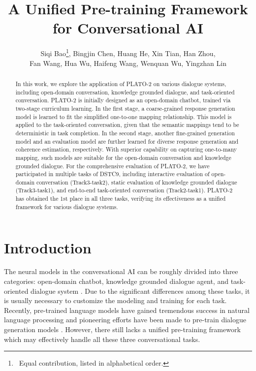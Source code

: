 \documentclass[letterpaper]{article} \usepackage{aaai21}  \usepackage{times}  \usepackage{helvet} \usepackage{courier}  \usepackage[hyphens]{url}  \usepackage{graphicx} \urlstyle{rm} \def\UrlFont{\rm}  \usepackage{natbib}  \usepackage{caption} \frenchspacing  \setlength{\pdfpagewidth}{8.5in}  \setlength{\pdfpageheight}{11in}  \usepackage{amsmath}
\title{A Unified Pre-training Framework for Conversational AI}
\author{Siqi Bao\thanks{~Equal contribution, listed in alphabetical order.}, Bingjin Chen\footnotemark[1], Huang He\footnotemark[1], Xin Tian\footnotemark[1], Han Zhou\footnotemark[1],\\ Fan Wang, Hua Wu, Haifeng Wang, Wenquan Wu, Yingzhan Lin\\}
\begin{document}
\maketitle

\begin{abstract}
In this work, we explore the application of PLATO-2 on various dialogue systems, including open-domain conversation, knowledge grounded dialogue, and task-oriented conversation. PLATO-2 is initially designed as an open-domain chatbot, trained via two-stage curriculum learning. In the first stage, a coarse-grained response generation model is learned to fit the simplified one-to-one mapping relationship. This model is applied to the task-oriented conversation, given that the semantic mappings tend to be deterministic in task completion. In the second stage, another fine-grained generation model and an evaluation model are further learned for diverse response generation and coherence estimation, respectively. With superior capability on capturing one-to-many mapping, such models are suitable for the open-domain conversation and knowledge grounded dialogue. For the comprehensive evaluation of PLATO-2, we have participated in multiple tasks of DSTC9, including interactive evaluation of open-domain conversation (Track3-task2), static evaluation of knowledge grounded dialogue (Track3-task1), and end-to-end task-oriented conversation (Track2-task1). PLATO-2 has obtained the 1st place in all three tasks, verifying its effectiveness as a unified framework for various dialogue systems. 
\end{abstract}

\section{Introduction}
The neural models in the conversational AI can be roughly divided into three categories: open-domain chatbot, knowledge grounded dialogue agent, and task-oriented dialogue system \cite{gao2018neural}. Due to the significant differences among these tasks, it is usually necessary to customize the modeling and training for each task. Recently, pre-trained language models have gained tremendous success in natural language processing \cite{devlin2019bert, brown2020language} and pioneering efforts have been made to pre-train dialogue generation models \cite{bao2019plato, zhang2019dialogpt}. However, there still lacks a unified pre-training framework which may effectively handle all these three conversational tasks. 
\end{document}
